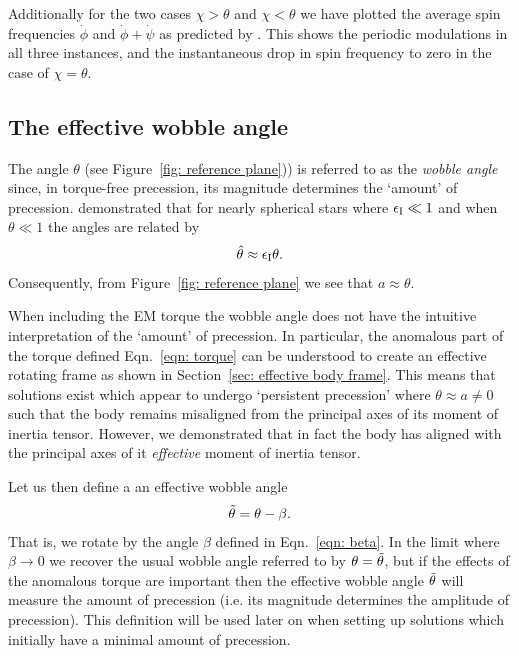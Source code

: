 \documentclass[../full_thesis/full_thesis.tex]{subfiles}
\begin{document}
Additionally for the two cases $\chi>\theta$ and $\chi < \theta$ we have
plotted the average spin frequencies $\dot{\phi}$ and $\dot{\phi}+\dot{\psi}$
as predicted by \citet{Jones2001}. This shows the periodic modulations in all
three instances, and the instantaneous drop in spin frequency to zero in the
case of $\chi=\theta$.

\subsection{The effective wobble angle}
\label{sec: wobble angle}
The angle $\theta$ (see Figure~\ref{fig: reference plane})) is referred to as the
\emph{wobble angle} since, in torque-free precession, its magnitude determines
the `amount' of precession. \citet{Jones2001} demonstrated that
for nearly spherical stars where $\epsilon_{\mathrm{I}} \ll 1$ and when $\theta \ll 1$ the
angles are related by
\begin{align}
\hat{\theta} \approx \epsilon_{\mathrm{I}}\theta.
\label{eqn: theta hat theta}
\end{align}
Consequently, from Figure~\ref{fig: reference plane} we see that $a\approx
\theta$.

When including the EM torque the wobble angle
does not have the intuitive interpretation of the `amount' of precession.  In
particular, the anomalous part of the torque defined Eqn.~\eqref{eqn: torque}
can be understood to create an effective rotating frame as shown in Section~\ref{sec:
effective body frame}. This means that solutions exist which appear to undergo
`persistent precession' where $\theta \approx a\ne0$ such that the body remains
misaligned from the principal axes of its moment of inertia tensor. However, we
demonstrated that in fact the body has aligned with the principal axes of
it \emph{effective} moment of inertia tensor.

Let us then define a an effective wobble angle
\begin{align}
\tilde{\theta} = \theta - \beta.
\label{eqn: wobble angle}
\end{align}
That is, we rotate by the angle $\beta$ defined in Eqn.~\eqref{eqn: beta}. In
the limit where $\beta \rightarrow 0$ we recover the usual wobble angle referred
to by \citet{Jones2001} $\theta = \tilde{\theta}$, but if the effects of the
anomalous torque are important then the effective wobble angle $\tilde{\theta}$ will
measure the amount of precession (i.e. its magnitude determines the amplitude
of precession). This definition will be used later on when setting up solutions
which initially have a minimal amount of precession.
\end{document}
